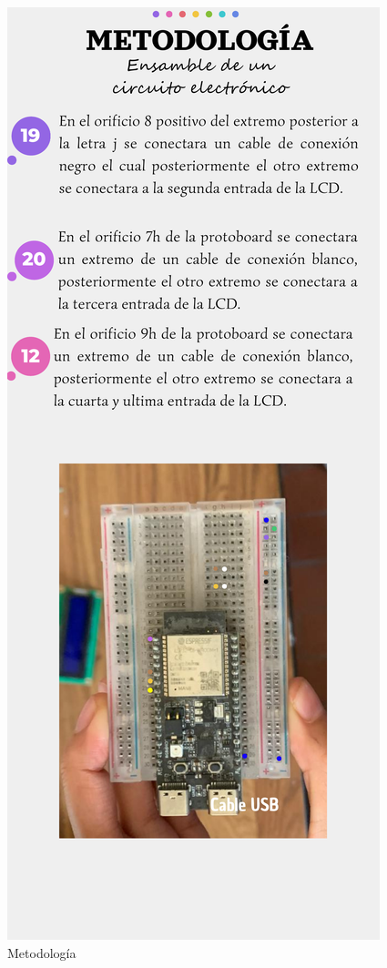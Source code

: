     \begin{figure}[H]
        \centering
        \includegraphics[trim = {5mm 10mm 5mm 50mm},clip,scale=0.4]{16/Img/Instructivo C.E (3).pdf}
        \caption{Metodología}
        \label{fig:metodología}
    \end{figure}
